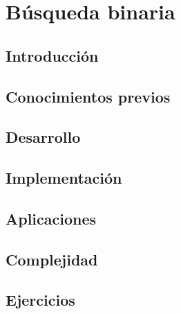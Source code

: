 \chapter{Búsqueda binaria}
\section{Introducción}

\section{Conocimientos previos}

\section{Desarrollo}

\section{Implementación}

\section{Aplicaciones}

\section{Complejidad}

\section{Ejercicios}
